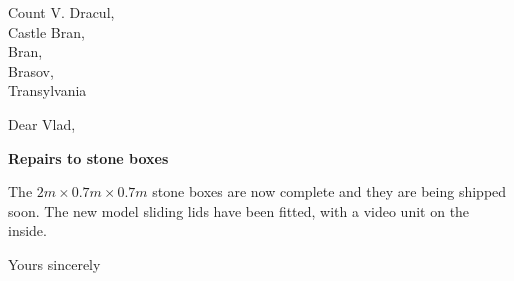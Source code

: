 \documentclass[11pt]{letter}
\date{{\small\em October 31, 2000}}
\begin{document}
\pagecolor{magenta}
\begin{letter}{Count V. Dracul, \\
          Castle Bran, \\
           Bran,  \\
Brasov,\\
  Transylvania}


\rm
\opening{Dear  Vlad,}
\begin{center}
{\bf  Repairs to stone boxes}
\end{center} \rm
The $2m\times 0.7m\times 0.7m$ stone boxes are now complete
and they are being shipped soon. The new model sliding
lids have been fitted, with a video unit
on the inside.




 \closing{Yours sincerely}


\end{letter}
\end{document}

